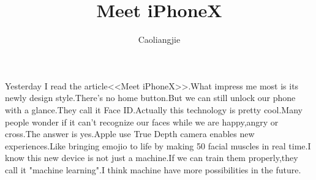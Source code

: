 \documentclass{ctexart}
\begin{document}
\title{Meet iPhoneX}
\author{Caoliangjie}
\maketitle
Yesterday I read the article<<Meet iPhoneX>>.What impress me most is its newly design style.There's no home button.But we can still unlock our phone with a glance.They call it Face ID.Actually this technology is pretty cool.Many people wonder if it can't recognize our faces while we are happy,angry or cross.The answer is yes.Apple use True Depth camera enables new experiences.Like bringing emojio to life by making 50 facial muscles in real time.I know this new device is not just a machine.If we can train them properly,they call it "machine learning".I think machine have more possibilities in the future.
\end{document}
